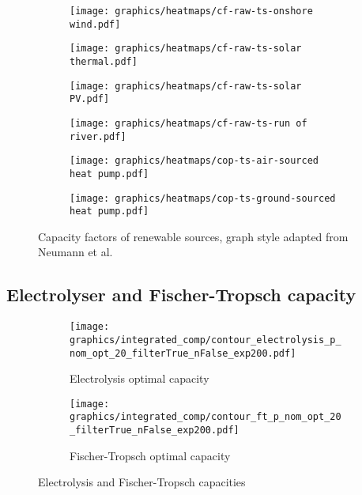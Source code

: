\clearpage
\begin{figure}
    \centering
        \begin{subfigure}[h]{0.49\textwidth}
            \centering
        \texttt{[image: graphics/heatmaps/cf-raw-ts-onshore wind.pdf]}
    \end{subfigure}
    \begin{subfigure}[h]{0.49\textwidth}
        \centering
        \texttt{[image: graphics/heatmaps/cf-raw-ts-solar thermal.pdf]}
    \end{subfigure}
    \begin{subfigure}[h]{0.49\textwidth}
        \centering
        \texttt{[image: graphics/heatmaps/cf-raw-ts-solar PV.pdf]}
    \end{subfigure}
    \begin{subfigure}[h]{0.49\textwidth}
        \centering
        \texttt{[image: graphics/heatmaps/cf-raw-ts-run of river.pdf]}
    \end{subfigure}
    \begin{subfigure}[h]{0.49\textwidth}
        \centering
        \texttt{[image: graphics/heatmaps/cop-ts-air-sourced heat pump.pdf]}
    \end{subfigure}
    \begin{subfigure}[h]{0.49\textwidth}
        \centering
        \texttt{[image: graphics/heatmaps/cop-ts-ground-sourced heat pump.pdf]}
    \end{subfigure}
    \caption{Capacity factors of renewable sources, graph style adapted from Neumann et al. \cite{Neumann2022}}
    \label{fig:ren-cfs}
\end{figure}



\subsection{Electrolyser and Fischer-Tropsch capacity}


\begin{figure*}[h] %
    \centering
    \begin{subfigure}[b]{0.45\linewidth}
        \centering
        \texttt{[image: graphics/integrated\_comp/contour\_electrolysis\_p\_nom\_opt\_20\_filterTrue\_nFalse\_exp200.pdf]}
        \caption{Electrolysis optimal capacity}
        \label{fig:ely-p-nom-opt}
    \end{subfigure}
    \hfill
    \begin{subfigure}[b]{0.45\linewidth}
        \centering
        \texttt{[image: graphics/integrated\_comp/contour\_ft\_p\_nom\_opt\_20\_filterTrue\_nFalse\_exp200.pdf]}
        \caption{Fischer-Tropsch optimal capacity}
        \label{fig:ft-p-nom-opt}
    \end{subfigure}

    \hfill

    \caption{Electrolysis and Fischer-Tropsch capacities}
    \label{fig:ely-ft-p-nom-opt}
\end{figure*}

\clearpage